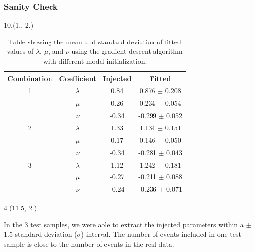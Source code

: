 \documentclass[12pt, xcolor={dvipsnames}, aspectratio = 169, sans,mathserif]{beamer}
\begin{document}
\begin{frame}
\frametitle{Sanity Check}

\begin{textblock}{10.}(1., 2.)
\begin{center}
\begin{table}
\begin{tabular}{ |c| c| c| c| }
\hline
Combination & Coefficient & Injected & Fitted \\
\hline
1           & $\lambda$   & 0.84      & 0.876 $\pm$ 0.208 \\
            & $\mu$       & 0.26      & 0.234 $\pm$ 0.054 \\
            & $\nu$       & -0.34      & -0.299 $\pm$ 0.052 \\
\hline
2           & $\lambda$   & 1.33      & 1.134 $\pm$ 0.151 \\
            & $\mu$       & 0.17      & 0.146 $\pm$ 0.050 \\
            & $\nu$       & -0.34      & -0.281 $\pm$ 0.043 \\
\hline
3           & $\lambda$   & 1.12      & 1.242 $\pm$ 0.181 \\
            & $\mu$       & -0.27      & -0.211 $\pm$ 0.088 \\
            & $\nu$       & -0.24      & -0.236 $\pm$ 0.071 \\
\hline

\end{tabular}
  \caption{Table showing the mean and standard deviation of fitted values of $\lambda$, $\mu$, and $\nu$ using the gradient descent algorithm with different model initialization.}
  \label{tabel:1}
\end{table}
\end{center}
\end{textblock}

\begin{textblock}{4.}(11.5, 2.)
\begin{small}
In the 3 test samples, we were able to extract the injected parameters within a $\pm$1.5 standard deviation ($\sigma$) interval. The number of events included in one test sample is close to the number of events in the real data.
\end{small}
\end{textblock}

\end{frame}
\end{document}
